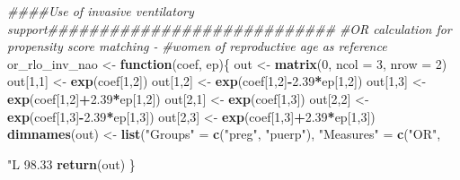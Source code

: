 \documentclass[
]{article}
\newenvironment{Shaded}{\begin{snugshade}}{\end{snugshade}}
\newcommand{\CommentTok}[1]{\textcolor[rgb]{0.56,0.35,0.01}{\textit{#1}}}
\newcommand{\ControlFlowTok}[1]{\textcolor[rgb]{0.13,0.29,0.53}{\textbf{#1}}}
\newcommand{\DataTypeTok}[1]{\textcolor[rgb]{0.13,0.29,0.53}{#1}}
\newcommand{\DecValTok}[1]{\textcolor[rgb]{0.00,0.00,0.81}{#1}}
\newcommand{\FloatTok}[1]{\textcolor[rgb]{0.00,0.00,0.81}{#1}}
\newcommand{\KeywordTok}[1]{\textcolor[rgb]{0.13,0.29,0.53}{\textbf{#1}}}
\newcommand{\NormalTok}[1]{#1}
\newcommand{\OperatorTok}[1]{\textcolor[rgb]{0.81,0.36,0.00}{\textbf{#1}}}
\newcommand{\StringTok}[1]{\textcolor[rgb]{0.31,0.60,0.02}{#1}}
\begin{document}
\begin{Shaded}
\begin{Highlighting}[]
\CommentTok{####Use of invasive ventilatory support############################}
\CommentTok{#OR calculation for propensity score matching - }
\CommentTok{#women of reproductive age as reference}
\NormalTok{or_rlo_inv_nao <-}\StringTok{ }\ControlFlowTok{function}\NormalTok{(coef, ep)\{}
\NormalTok{  out <-}\StringTok{ }\KeywordTok{matrix}\NormalTok{(}\DecValTok{0}\NormalTok{, }\DataTypeTok{ncol =} \DecValTok{3}\NormalTok{, }\DataTypeTok{nrow =} \DecValTok{2}\NormalTok{)}
\NormalTok{  out[}\DecValTok{1}\NormalTok{,}\DecValTok{1}\NormalTok{] <-}\StringTok{ }\KeywordTok{exp}\NormalTok{(coef[}\DecValTok{1}\NormalTok{,}\DecValTok{2}\NormalTok{])}
\NormalTok{  out[}\DecValTok{1}\NormalTok{,}\DecValTok{2}\NormalTok{] <-}\StringTok{ }\KeywordTok{exp}\NormalTok{(coef[}\DecValTok{1}\NormalTok{,}\DecValTok{2}\NormalTok{]}\OperatorTok{-}\FloatTok{2.39}\OperatorTok{*}\NormalTok{ep[}\DecValTok{1}\NormalTok{,}\DecValTok{2}\NormalTok{])}
\NormalTok{  out[}\DecValTok{1}\NormalTok{,}\DecValTok{3}\NormalTok{] <-}\StringTok{ }\KeywordTok{exp}\NormalTok{(coef[}\DecValTok{1}\NormalTok{,}\DecValTok{2}\NormalTok{]}\OperatorTok{+}\FloatTok{2.39}\OperatorTok{*}\NormalTok{ep[}\DecValTok{1}\NormalTok{,}\DecValTok{2}\NormalTok{])  }
\NormalTok{  out[}\DecValTok{2}\NormalTok{,}\DecValTok{1}\NormalTok{] <-}\StringTok{ }\KeywordTok{exp}\NormalTok{(coef[}\DecValTok{1}\NormalTok{,}\DecValTok{3}\NormalTok{])}
\NormalTok{  out[}\DecValTok{2}\NormalTok{,}\DecValTok{2}\NormalTok{] <-}\StringTok{ }\KeywordTok{exp}\NormalTok{(coef[}\DecValTok{1}\NormalTok{,}\DecValTok{3}\NormalTok{]}\OperatorTok{-}\FloatTok{2.39}\OperatorTok{*}\NormalTok{ep[}\DecValTok{1}\NormalTok{,}\DecValTok{3}\NormalTok{])}
\NormalTok{  out[}\DecValTok{2}\NormalTok{,}\DecValTok{3}\NormalTok{] <-}\StringTok{ }\KeywordTok{exp}\NormalTok{(coef[}\DecValTok{1}\NormalTok{,}\DecValTok{3}\NormalTok{]}\OperatorTok{+}\FloatTok{2.39}\OperatorTok{*}\NormalTok{ep[}\DecValTok{1}\NormalTok{,}\DecValTok{3}\NormalTok{]) }
  \KeywordTok{dimnames}\NormalTok{(out) <-}\StringTok{ }\KeywordTok{list}\NormalTok{(}\StringTok{"Groups"}\NormalTok{ =}\StringTok{ }\KeywordTok{c}\NormalTok{(}\StringTok{"preg"}\NormalTok{, }\StringTok{"puerp"}\NormalTok{), }
                        \StringTok{"Measures"}\NormalTok{ =}\StringTok{ }\KeywordTok{c}\NormalTok{(}\StringTok{"OR"}\NormalTok{, }\StringTok{"L 98.33%"}\NormalTok{, }\StringTok{"U 98.33%"}\NormalTok{))}
  \KeywordTok{return}\NormalTok{(out)}
\NormalTok{\}}

}
\end{Highlighting}
\end{Shaded}
\end{document}

